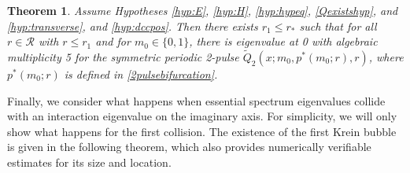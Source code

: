 \documentclass[10pt,reqno]{amsart}
\theoremstyle{plain}
\newtheorem{theorem}{Theorem}
\theoremstyle{definition}
\theoremstyle{remark}
\numberwithin{theorem}{section}
\numberwithin{equation}{section}
\begin{document}
\begin{theorem}\label{theorem:2peigssym}
Assume Hypotheses \ref{hyp:E}, \ref{hyp:H}, \ref{hyp:hypeq}, \ref{Qexistshyp}, and \ref{hyp:transverse}, and \ref{hyp:dccpos}. Then there exists $r_1 \leq r_*$ such that for all $r \in \mathcal{R}$ with $r \leq r_1$ and for $m_0 \in \{0, 1\}$, there is eigenvalue at 0 with algebraic multiplicity 5 for the symmetric periodic 2-pulse $\tilde{Q}_2(x; m_0, p^*(m_0; r), r)$, where $p^*(m_0; r)$ is defined in \cref{2pulsebifurcation}.
\end{theorem}

Finally, we consider what happens when essential spectrum eigenvalues collide with an interaction eigenvalue on the imaginary axis. For simplicity, we will only show what happens for the first collision. The existence of the first Krein bubble is given in the following theorem, which also provides numerically verifiable estimates for its size and location. 
\end{document}

